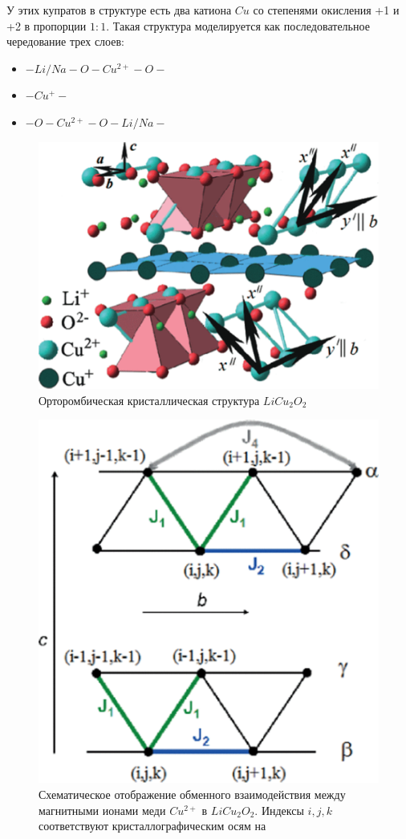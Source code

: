 \documentclass[11pt]{article}
\begin{document}
У этих купратов в структуре есть два катиона $Cu$ со степенями окисления +1 и +2 в пропорции $1:1$. Такая структура моделируется как последовательное чередование трех слоев:
\begin{itemize} 
\item $-Li/Na - O - Cu^{2+} - O -$
\item $- Cu^{+} -$
\item $- O - Cu^{2+} - O - Li/Na -$
\end{itemize} 

\begin{figure}[htp]
\centering
\includegraphics[scale=0.7]{LiCu2O2}
\caption {Орторомбическая кристаллическая структура $LiCu_2O_2$ ~\cite{seidov2017}}
\label{}
\end{figure}

\begin{figure}[htp]
\centering
\includegraphics[scale=0.7]{LiCu2O2_1}
\caption {Схематическое отображение обменного взаимодействия между магнитными ионами меди $Cu^{2+}$ в $LiCu_2O_2$. Индексы $i,j,k$ соответствуют кристаллографическим осям на ~\cite{seidov2017}}
\label{}
\end{figure}
\end{document}
